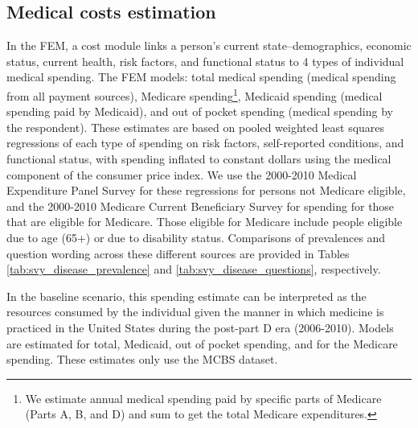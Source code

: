 \subsection{Medical costs estimation}
\label{sec:govt_revenue_and_expenditures_medcost_estimation}
In the FEM, a cost module links a person's current state--demographics, economic status, current health, risk factors, and functional status 
to 4 types of individual medical spending. The FEM models: total medical spending (medical spending from all payment sources), Medicare 
spending\footnote{We estimate annual medical spending paid by specific parts of 
Medicare (Parts A, B, and D) and sum to get the total Medicare expenditures.}, 
Medicaid spending (medical spending paid by Medicaid), and out of pocket spending 
(medical spending by the respondent). These estimates are based on pooled weighted 
least squares regressions of each type of spending on risk factors, self-reported 
conditions, and functional status, with spending inflated to constant dollars 
using the medical component of the consumer price index.  We use the 2000-2010 
Medical Expenditure Panel Survey 
for these regressions for persons 
not Medicare eligible, and the 2000-2010 Medicare Current Beneficiary Survey 
for spending for those that are eligible for Medicare. Those eligible for 
Medicare include people eligible due to age (65+) or due to disability status. Comparisons of prevalences and question wording across these different sources are provided in Tables \ref{tab:svy_disease_prevalence} and \ref{tab:svy_disease_questions}, respectively.

In the baseline scenario, this spending estimate can be interpreted as the resources consumed by the individual given the manner in which 
medicine is practiced in the United States during the post-part D era (2006-2010). 
Models are estimated for total, Medicaid, out of pocket spending, and for the Medicare spending. 
These estimates only use the MCBS dataset.

